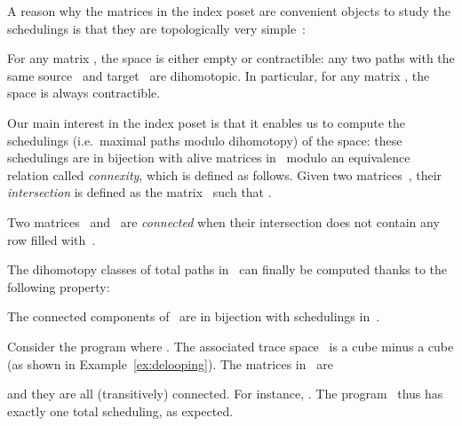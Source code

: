 \documentclass[orivec]{llncs} \usepackage[T1]{fontenc}
\newcommand{\comment}[1]{}
\newcommand{\ie}{i.e.~}
\begin{document}
\comment{
\begin{example}
  \label{ex:mat3d}
  The geometric semantics of the program constituted of three copies of the
  thread  in parallel, with , is
  \vspace{-2ex}
  
  The spaces~ corresponding to the matrices
  
  are respectively
  
  The first two matrices are alive, as shown by the drawn total paths.
\end{example}
}

A reason why the matrices in the index poset are convenient objects to study the
schedulings is that they are topologically very
simple~\cite{raussen2010simplicial}:
\begin{proposition}
  \label{prop:alive-dihom}
  For any matrix , the space  is either empty or
  contractible: any two paths with the same source~ and target~ are
  dihomotopic. In particular, for any matrix , the space
   is always contractible.
\end{proposition}

Our main interest in the index poset is that it enables us to compute the
schedulings (\ie maximal paths modulo dihomotopy) of the space: these
schedulings are in bijection with alive matrices in~ modulo an
equivalence relation called \emph{connexity}, which is defined as follows. Given
two matrices~, their \emph{intersection}  is
defined as the matrix~ such that .

\begin{definition}
  \label{def:connected}
  Two matrices~ and~ are \emph{connected} when their intersection does not
  contain any row filled with~.
\end{definition}

\noindent
The dihomotopy classes of total paths in~ can finally be computed thanks to
the following property:

\begin{proposition}
  \label{prop:conn-comp}
  The connected components of~ are in bijection with schedulings in~.
\end{proposition}

\begin{example}
  \label{ex:cube}
  Consider the program  where . The associated trace
  space~ is a cube minus a cube (as shown in Example~\ref{ex:delooping}).
  The matrices in~ are

  and they are all (transitively) connected. For instance,
  . The program~ thus has exactly one total scheduling, as expected.
\end{example}
\end{document}

